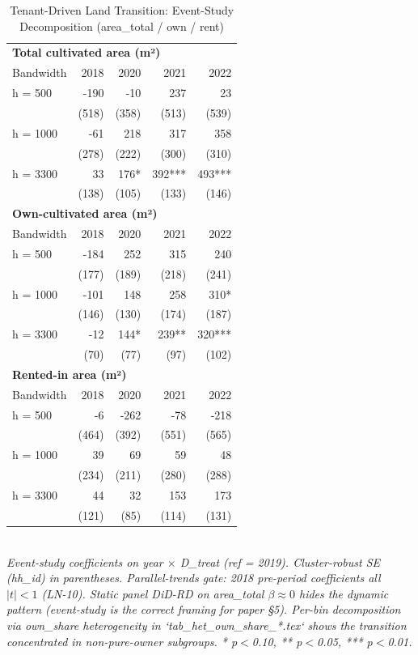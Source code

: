 \begin{table}[t]
\centering
\caption{Tenant-Driven Land Transition: Event-Study Decomposition (area\_total / own / rent)}
\label{tab:stabilization_en}
\begin{tabular}{lrrrr}
\toprule
\multicolumn{5}{l}{\textbf{Total cultivated area (m²)}} \\
Bandwidth & 2018 & 2020 & 2021 & 2022 \\
\midrule
h = 500 & -190 & -10 & 237 & 23 \\
    & (518) & (358) & (513) & (539) \\
h = 1000 & -61 & 218 & 317 & 358 \\
    & (278) & (222) & (300) & (310) \\
h = 3300 & 33 & 176* & 392*** & 493*** \\
    & (138) & (105) & (133) & (146) \\
\midrule
\multicolumn{5}{l}{\textbf{Own-cultivated area (m²)}} \\
Bandwidth & 2018 & 2020 & 2021 & 2022 \\
\midrule
h = 500 & -184 & 252 & 315 & 240 \\
    & (177) & (189) & (218) & (241) \\
h = 1000 & -101 & 148 & 258 & 310* \\
    & (146) & (130) & (174) & (187) \\
h = 3300 & -12 & 144* & 239** & 320*** \\
    & (70) & (77) & (97) & (102) \\
\midrule
\multicolumn{5}{l}{\textbf{Rented-in area (m²)}} \\
Bandwidth & 2018 & 2020 & 2021 & 2022 \\
\midrule
h = 500 & -6 & -262 & -78 & -218 \\
    & (464) & (392) & (551) & (565) \\
h = 1000 & 39 & 69 & 59 & 48 \\
    & (234) & (211) & (280) & (288) \\
h = 3300 & 44 & 32 & 153 & 173 \\
    & (121) & (85) & (114) & (131) \\
\midrule
\bottomrule
\end{tabular}
\\
\footnotesize\textit{Event-study coefficients on year $\times$ D\_treat (ref = 2019). Cluster-robust SE (hh\_id) in parentheses. Parallel-trends gate: 2018 pre-period coefficients all $|t|<1$ (LN-10). Static panel DiD-RD on area\_total $\beta \approx 0$ hides the dynamic pattern (event-study is the correct framing for paper \S5). Per-bin decomposition via own\_share heterogeneity in `tab_het_own_share_*.tex` shows the transition concentrated in non-pure-owner subgroups. * p$<$0.10, ** p$<$0.05, *** p$<$0.01.}
\end{table}

